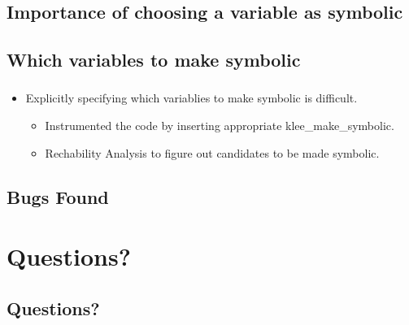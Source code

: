\documentclass[mathserif,10pt]{beamer}
\newcommand{\cmt}[1]{}
\begin{document}
\subsection{Importance of choosing a variable as symbolic}
\frame
{
  \frametitle{\subsecname}
  \lstI

}

\subsection{Which variables to make symbolic}
\frame
{
  \frametitle{\subsecname}
  \begin{itemize}
    \item Explicitly specifying which variablies to make symbolic is difficult. 
    \vspace{1cm}
    \begin{itemize}
      \item Instrumented the code by inserting appropriate klee\_make\_symbolic.
      \item Rechability Analysis to figure out candidates to be made symbolic.
    \end{itemize}
  \end{itemize}
  \cmt{
    Rather that explicitly making the  inputs of the test program
      symbolic, let klee instrument the code by inserting klee_make_symbolic
      calls. The inputs that we are considering include command line arguments,
      file inputs, globals and variables used to read inputs (for example using
          scanf).
  }
}


\subsection{Bugs Found}
\frame
{
  \frametitle{\subsecname}
  \lstIII
}

\section{Questions?}
\subsection{Questions?}
\frame
{}
\end{document}

